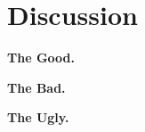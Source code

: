 \section{Discussion}

\vspace{1ex}\noindent{}\textbf{The Good.}

\vspace{1ex}\noindent{}\textbf{The Bad.}

\vspace{1ex}\noindent{}\textbf{The Ugly.}
